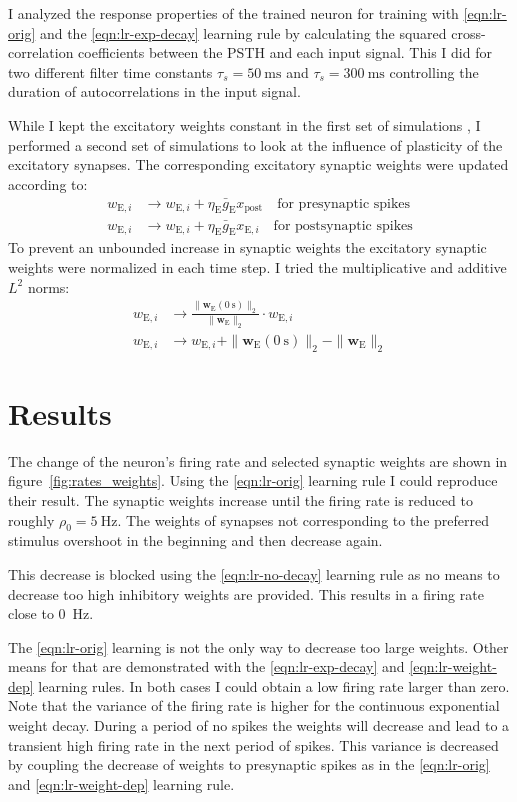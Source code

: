 \documentclass[11pt,a4paper]{scrartcl}
\newcommand{\E}[1]{_{\text{E}#1}}
\newcommand{\post}{_{\text{post}}}
\begin{document}
I analyzed the response properties of the trained neuron for training with 
\ref{eqn:lr-orig} and the \ref{eqn:lr-exp-decay} learning rule by calculating 
the squared cross-correlation coefficients between the PSTH and each input 
signal. This I did for two different filter time constants $\tau_s 
= \SI{50}{\milli\second}$ and $\tau_s = \SI{300}{\milli\second}$ controlling the 
duration of autocorrelations in the input signal.

While I kept the excitatory weights constant in the first set of simulations
, I performed a second set of simulations to look at the influence of plasticity 
of the excitatory synapses. The corresponding excitatory synaptic weights were 
updated according to:
\begin{align}
    w\E{,i} &\rightarrow w\E{,i} + \eta\E{} \bar g\E{} x\post \quad\text{for 
    presynaptic spikes} \\
    w\E{,i} &\rightarrow w\E{,i} + \eta\E{} \bar g\E{} x\E{,i} \quad\text{for 
    postsynaptic spikes}
\end{align}
To prevent an unbounded increase in synaptic weights the excitatory synaptic 
weights were normalized in each time step. I tried the multiplicative and 
additive $L^2$ norms:
\begin{align}
    w\E{,i} &\rightarrow 
\frac{\|\mathbf{w}\E{}(\SI{0}{\second})\|_2}{\|\mathbf{w}\E{}\|_2} \cdot w\E{,i} 
\tag{multiplicative $L^2$} \\
    w\E{,i} &\rightarrow w\E{,i} + \|\mathbf{w}\E{}(\SI{0}{\second})\|_2 
- \|\mathbf{w}\E{}\|_2 \tag{additive $L^2$}
\end{align}

\section{Results} \label{sec:results}
The change of the neuron's firing rate and selected synaptic weights are shown 
in figure~\ref{fig:rates_weights}. Using the \ref{eqn:lr-orig} learning rule 
I could reproduce their result. The synaptic weights increase until the firing 
rate is reduced to roughly $\rho_0 = \SI{5}{\hertz}$.  The weights of synapses 
not corresponding to the preferred stimulus overshoot in the beginning and then 
decrease again.

This decrease is blocked using the \ref{eqn:lr-no-decay} learning rule as no 
means to decrease too high inhibitory weights are provided. This results in 
a firing rate close to \SI{0}{Hz}.

The \ref{eqn:lr-orig} learning is not the only way to decrease too large 
weights. Other means for that are demonstrated with the \ref{eqn:lr-exp-decay} 
and \ref{eqn:lr-weight-dep} learning rules. In both cases I could obtain a low 
firing rate larger than zero. Note that the variance of the firing rate is 
higher for the continuous exponential weight decay. During a period of no spikes 
the weights will decrease and lead to a transient high firing rate in the next 
period of spikes.  This variance is decreased by coupling the decrease of 
weights to presynaptic spikes as in the \ref{eqn:lr-orig} and 
\ref{eqn:lr-weight-dep} learning rule.
\end{document}
